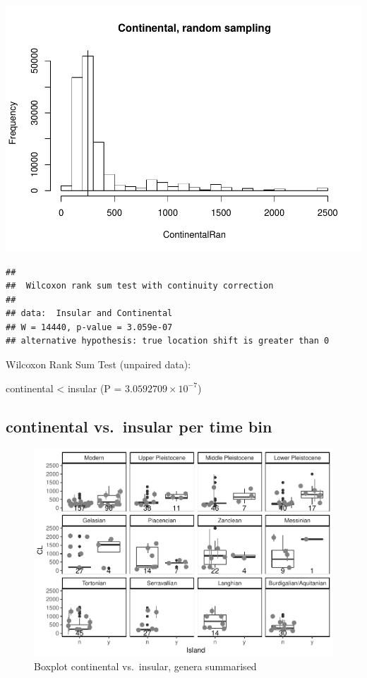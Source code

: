 \documentclass[]{article}
\begin{document}
\includegraphics{MA_JJ_files/figure-latex/RSCI-1.pdf}

\begin{verbatim}
## 
##  Wilcoxon rank sum test with continuity correction
## 
## data:  Insular and Continental
## W = 14440, p-value = 3.059e-07
## alternative hypothesis: true location shift is greater than 0
\end{verbatim}

Wilcoxon Rank Sum Test (unpaired data):

continental \textless{} insular (P = \(3.0592709\times 10^{-7}\))

\newpage

\subsection{continental vs.~insular per time
bin}\label{continental-vs.insular-per-time-bin-1}

\begin{figure}[htbp]
\centering
\includegraphics{MA_JJ_files/figure-latex/BPCIBins-1.pdf}
\caption{Boxplot continental vs.~insular, genera summarised}
\end{figure}
\end{document}
